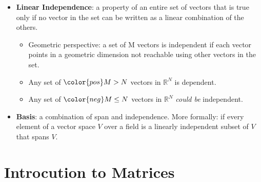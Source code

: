 \documentclass[12pt,a4paper]{article}
\begin{document}
\begin{itemize}
    \item \textbf{Linear Independence}: a property of an entire set of vectors that is true only if no vector in the set can be written as a linear combination of the others.
        \begin{itemize}
            \item Geometric perspective: a set of M vectors is independent if each vector points in a geometric dimension not reachable using other vectors in the set.
            \item Any set of \({\color{pos}M>N}\) vectors in \(\mathbb{R}^N\) is {\color{o-Sun}dependent}.
            \item Any set of \({\color{neg}M\leq N}\) vectors in \(\mathbb{R}^N\) \textit{could be} {\color{o-Sun}independent}.
        \end{itemize}
    \item \textbf{Basis}: a combination of span and independence. More formally: if every element of a vector space \(V\) over a field is a {\color{o-Sun}linearly independent subset} of \(V\) that {\color{o-Sun}spans} \(V\).
\end{itemize}

\clearpage
\section{Introcution to Matrices}
\end{document}
